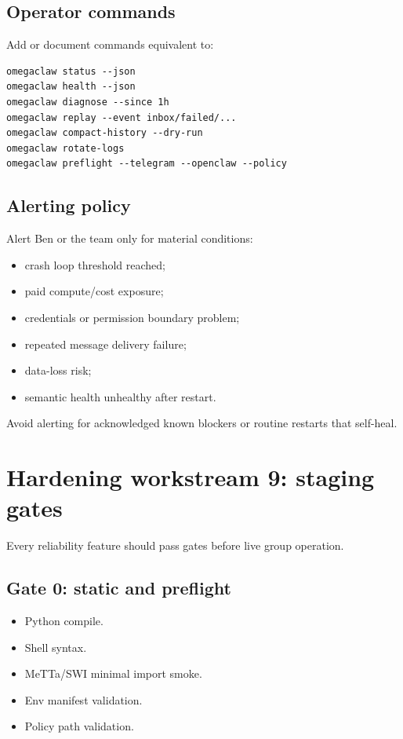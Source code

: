 \documentclass[11pt]{article}
\begin{document}
\subsection{Operator commands}

Add or document commands equivalent to:

\begin{Verbatim}[fontsize=\small]
omegaclaw status --json
omegaclaw health --json
omegaclaw diagnose --since 1h
omegaclaw replay --event inbox/failed/...
omegaclaw compact-history --dry-run
omegaclaw rotate-logs
omegaclaw preflight --telegram --openclaw --policy
\end{Verbatim}

\subsection{Alerting policy}

Alert Ben or the team only for material conditions:

\begin{itemize}
  \item crash loop threshold reached;
  \item paid compute/cost exposure;
  \item credentials or permission boundary problem;
  \item repeated message delivery failure;
  \item data-loss risk;
  \item semantic health unhealthy after restart.
\end{itemize}

Avoid alerting for acknowledged known blockers or routine restarts that self-heal.

\section{Hardening workstream 9: staging gates}

Every reliability feature should pass gates before live group operation.

\subsection{Gate 0: static and preflight}

\begin{itemize}
  \item Python compile.
  \item Shell syntax.
  \item MeTTa/SWI minimal import smoke.
  \item Env manifest validation.
  \item Policy path validation.
\end{itemize}
\end{document}
